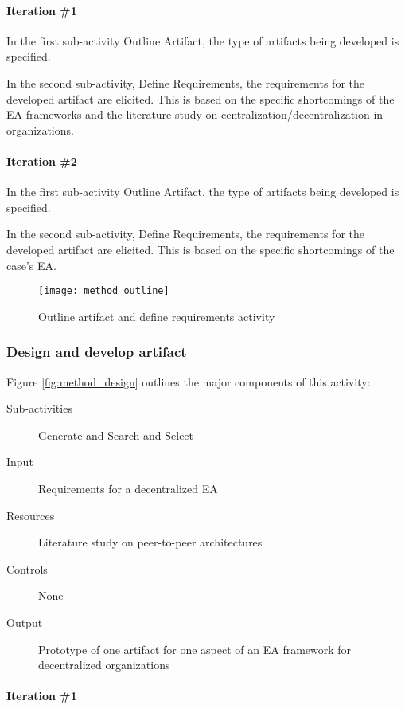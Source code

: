 \paragraph{Iteration \#1}

In the first sub-activity Outline Artifact, the type of artifacts being developed is specified. 

In the second sub-activity, Define Requirements, the requirements for the developed artifact are elicited. This is based on the specific shortcomings of the EA frameworks and the literature study on centralization/decentralization in organizations.

\paragraph{Iteration \#2}

In the first sub-activity Outline Artifact, the type of artifacts being developed is specified. 

In the second sub-activity, Define Requirements, the requirements for the developed artifact are elicited. This is based on the specific shortcomings of the case's EA.


\begin{figure}
\centering
\texttt{[image: method\_outline]}
\caption{Outline artifact and define requirements activity}
\label{fig:method_outline}
\end{figure}

\subsubsection*{Design and develop artifact}

Figure \ref{fig:method_design} outlines the major components of this activity:
\begin{description}
  \item[Sub-activities] Generate and Search and Select ~\cite[Ch. 7]{johannessonPerjons2012}
  \item[Input]  Requirements for a decentralized EA 
  \item[Resources] Literature study on peer-to-peer architectures
  \item[Controls] None
  \item[Output] Prototype of one artifact for one aspect of an EA framework for decentralized organizations 
\end{description}

\paragraph{Iteration \#1}

